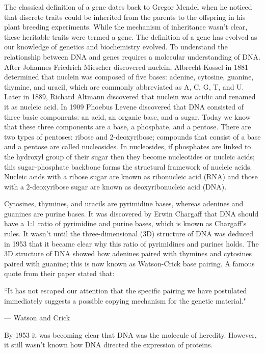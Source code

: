 The classical definition of a gene dates back to Gregor Mendel when he noticed that discrete traits could be inherited from the parents to the offspring in his plant breeding experiments. While the mechanism of inheritance wasn't clear, these heritable traits were termed a gene. The definition of a gene has evolved as our knowledge of genetics and biochemistry evolved\cite{pmid17567988}. To understand the relationship between DNA and genes requires a molecular understanding of DNA. After Johannes Friedrich Miescher discovered nuclein, Albrecht Kossel in 1881 determined that nuclein was composed of five bases: adenine, cytosine, guanine, thymine, and uracil, which are commonly abbreviated as A, C, G, T, and U. Later in 1889, Richard Altmann discovered that nuclein was acidic and renamed it as nucleic acid. In 1909 Phoebus Levene discovered that DNA consisted of three basic components: an acid, an organic base, and a sugar. Today we know that these three components are a base, a phosphate, and a pentose. There are two types of pentoses: ribose and 2-deoxyribose; compounds that consist of a base and a pentose are called nucleosides. In nucleosides, if phosphates are linked to the hydroxyl group of their sugar then they become nucleotides or nucleic acids; this sugar-phosphate backbone forms the structural framework of nucleic acids. Nucleic acids with a ribose sugar are known as ribonucleic acid (RNA) and those with a 2-deoxyribose sugar are known as deoxyribonucleic acid (DNA).

Cytosines, thymines, and uracils are pyrimidine bases, whereas adenines and guanines are purine bases. It was discovered by Erwin Chargaff that DNA should have a 1:1 ratio of pyrimidine and purine bases, which is known as Chargaff's rules. It wasn't until the three-dimensional (3D) structure of DNA was deduced\cite{WATSON_1953} in 1953 that it became clear why this ratio of pyrimidines and purines holds. The 3D structure of DNA showed how adenines paired with thymines and cytosines paired with guanine; this is now known as Watson-Crick base pairing. A famous quote from their paper stated that:

\epigraph{``It has not escaped our attention that the specific pairing we have postulated immediately suggests a possible copying mechanism for the genetic material."}{--- \textup{Watson and Crick}}

By 1953 it was becoming clear that DNA was the molecule of heredity. However, it still wasn't known how DNA directed the expression of proteins. 

